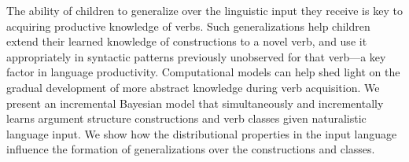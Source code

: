 The ability of children to generalize over the linguistic input they receive is key to acquiring productive knowledge of verbs.  Such generalizations help children extend their learned knowledge of constructions to a novel verb, and use it appropriately in syntactic patterns previously unobserved for that verb---a key factor in language productivity.  Computational models can help shed light on the gradual development of more abstract knowledge during verb acquisition. We present an incremental Bayesian model that simultaneously and incrementally learns argument structure constructions and verb classes given naturalistic language input.  We show how the distributional properties in the input language influence the formation of generalizations over the constructions and classes.
